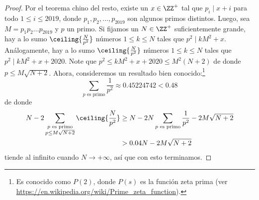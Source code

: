 \begin{proof}
	Por el teorema chino del resto, existe un $x\in\ZZ^+$ tal que $p_i\mid x+i$ para todo $1\le i\le 2019$, donde $p_1,p_2,\dots,p_{2019}$ son algunos primos distintos. Luego, sea $M=p_1p_2\dots p_{2019}$ y $p$ un primo. Si fijamos un $N\in\ZZ^+$ suficientemente grande, hay a lo sumo $\ceiling{\frac{N}{p^2}}$ números $1\le k\le N$ tales que $p^2\mid kM^2+x$. Análogamente, hay a lo sumo $\ceiling{\frac{N}{p^2}}$ números $1\le k\le N$ tales que $p^2\mid kM^2+x+2020$. Note que $p^2\le kM^2+x+2020\le M^2(N+2)$ de donde $p\le M\sqrt{N+2}$. Ahora, consideremos un resultado bien conocido:\footnote{Es conocido como $P(2)$, donde $P(s)$ es la función zeta prima (ver \url{https://en.wikipedia.org/wiki/Prime_zeta_function}).}
	\[\sum_{p\text{ es primo}}\frac{1}{p^2}\approx 0.45224742<0.48\]
	de donde
	\begin{align*}
		N-2\sum_{\substack{p\text{ es primo}\\p\le M\sqrt{N+2}}}\ceiling{\frac{N}{p^2}}
		&\ge N-2N\sum_{\substack{p\text{ es primo}}}\frac{1}{p^2}-2M\sqrt{N+2}\\
		&>0.04N-2M\sqrt{N+2}
	\end{align*}
	tiende al infinito cuando $N\to+\infty$, así que con esto terminamos.
\end{proof}

